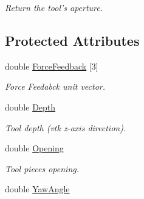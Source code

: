 \begin{DoxyCompactItemize}
\begin{DoxyCompactList}\small\item\em Return the tool's aperture. \item\end{DoxyCompactList}\end{DoxyCompactItemize}
\subsection*{Protected Attributes}
\begin{DoxyCompactItemize}
\item 
\hypertarget{classvtkToolLaparoscopy_a1575099ef78427b3c83266c1ed32898e}{
double \hyperlink{classvtkToolLaparoscopy_a1575099ef78427b3c83266c1ed32898e}{ForceFeedback} \mbox{[}3\mbox{]}}
\label{classvtkToolLaparoscopy_a1575099ef78427b3c83266c1ed32898e}

\begin{DoxyCompactList}\small\item\em Force Feedabck unit vector. \item\end{DoxyCompactList}\item 
\hypertarget{classvtkToolLaparoscopy_aae92c27b66b795441c3feba84856b57b}{
double \hyperlink{classvtkToolLaparoscopy_aae92c27b66b795441c3feba84856b57b}{Depth}}
\label{classvtkToolLaparoscopy_aae92c27b66b795441c3feba84856b57b}

\begin{DoxyCompactList}\small\item\em Tool depth (vtk z-\/axis direction). \item\end{DoxyCompactList}\item 
\hypertarget{classvtkToolLaparoscopy_afb70eefb12cc30eca3417530f5e823c8}{
double \hyperlink{classvtkToolLaparoscopy_afb70eefb12cc30eca3417530f5e823c8}{Opening}}
\label{classvtkToolLaparoscopy_afb70eefb12cc30eca3417530f5e823c8}

\begin{DoxyCompactList}\small\item\em Tool pieces opening. \item\end{DoxyCompactList}\item 
\hypertarget{classvtkToolLaparoscopy_ad08f41426c33237d2335f677489631ee}{
double \hyperlink{classvtkToolLaparoscopy_ad08f41426c33237d2335f677489631ee}{YawAngle}}
\label{classvtkToolLaparoscopy_ad08f41426c33237d2335f677489631ee}


\end{DoxyCompactItemize}
